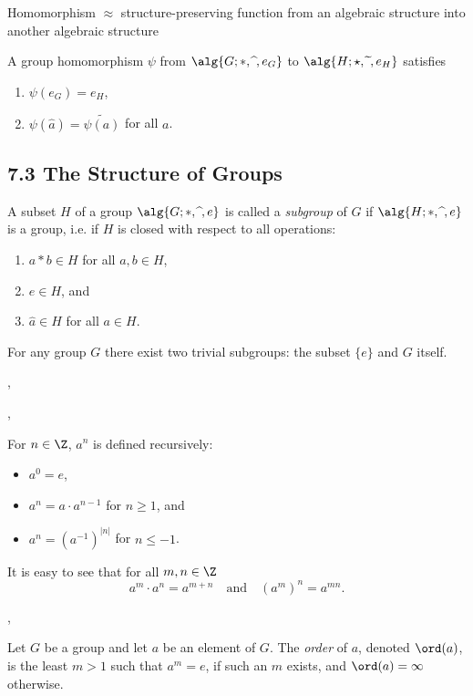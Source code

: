 \Com Homomorphism $\approx$ structure-preserving function from an algebraic
structure into another algebraic structure

 A group homomorphism $\psi$ from $\alg{G;*,\widehat{ \ }, e_G}$ to 
$\alg{H;\star,\widetilde{\ }, e_H}$ satisfies
\begin{enumerate}[label=(\roman*)]
  \item $\psi(e_G) = e_H$,
  \item $\psi(\widehat{a})=\widetilde{\psi(a)}$ for all $a$.
\end{enumerate}




\vspace{100pt}


\subsection*{7.3 The Structure of Groups}

 A subset $H$ of a group $\alg{G;*,\widehat{ \ }, e}$ is called a
\emph{subgroup} of $G$ if $\alg{H;*,\widehat{ \ }, e}$ is a group, i.e. if $H$
is closed with respect to all operations:
\begin{enumerate}[label=(\arabic*)]
  \item $a*b\in H$ for all $a,b \in H$,
  \item $e\in H$, and
  \item $\widehat{a}\in H$ for all $a \in H$.
\end{enumerate}

\Com For any group $G$ there exist two trivial subgroups: the subset $\{e\}$ and
$G$ itself.

\sep


\sep

\Def{*} For $n\in \Z$, $a^{n}$ is defined recursively:
\begin{itemize}
  \item $a^0=e$,
  \item $a^n = a\cdot a^{n-1}$ for $n\geq 1$, and
  \item $a^{n} = (a^{-1})^{|n|}$ for $n\leq -1$.	
\end{itemize}

It is easy to see that for all $m,n\in \Z$
\[
a^m\cdot a^n = a^{m+n} \quad \text{and} \quad (a^m)^n = a^{mn}.
\]

\sep

 Let $G$ be a group and let $a$ be an element of $G$. The \emph{order}
of $a$, denoted $\ord(a)$, is the least $m>1$ such that $a^{m}=e$, if such an
$m$ exists, and $\ord(a)=\infty$ otherwise.

